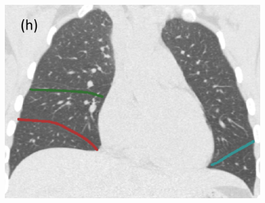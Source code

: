 \documentclass[]{spie}  %
\begin{document}
{\begin{figure}[htbp]
\begin{subfigure}
{\begin{minipage}[t]{0.2\linewidth}
  \includegraphics[width=\linewidth,trim={{.0\wd0} {.0\wd0} {.0\wd0} {.0\wd0}},clip]{Image/H1335_FRC_PCAInitial_Coronal.png}
  \centerline{}
	\end{minipage}%
   }%
  \label{fig:HLASegmentationResults-h} 
\end{subfigure}
\begin{subfigure}{
  \begin{minipage}[t]{0.2\linewidth}

\end{minipage}}
\end{subfigure}
\end{figure}}
\end{document}
